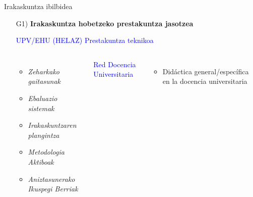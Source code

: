\documentclass[
 10pt,%
 compress,%
 t,       %
 xcolor=svgnames
]{beamer}
\theoremstyle{definition} \newtheorem{definicion}{Definicion}[section]
\theoremstyle{propiedades} \newtheorem{propiedades}{Propiedades}[section]
\begin{document}
\begin{frame}{Irakaskuntza ibilbidea} 

\medskip






\begin{itemize}
	\item[G1)] \textbf{Irakaskuntza hobetzeko  prestakuntza jasotzea}


\bigskip
\bigskip

\small
\hspace*{0.3cm} \textcolor{blue}{UPV/EHU (HELAZ)} \hspace*{2.8cm} \textcolor{blue}{Prestakuntza teknikoa}

%
%
\begin{columns}
	
	
\begin{itemize}

	\item \textit{Zeharkako gaitasunak}
	
	\item  \textit{Ebaluazio sistemak}
	
	\item \textit{Irakaskuntzaren plangintza}	
	
	\item \textit{Metodologia Aktiboak}
		
	\item \textit{Aniztasunerako Ikuspegi Berriak} 

\end{itemize}


\medskip
\hspace*{0.5cm} \textcolor{blue}{Red Docencia Universitaria} 

\begin{itemize}
	\item Didáctica general/específica en la docencia universitaria
\end{itemize}%



	

\end{columns}
\end{itemize}
\end{frame}
\end{document}
